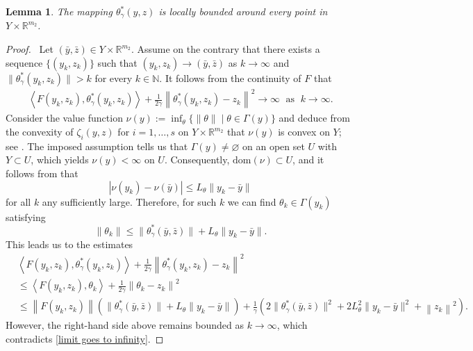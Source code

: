 \documentclass[11pt,a4paper]{article}
\newtheorem{lemma}[theorem]{Lemma}
\theoremstyle{plain}
\begin{document}
\begin{lemma}\label{lemma:local_boundedness}
The mapping \( \theta_\gamma^*(y, z)\) is locally bounded around every point in $Y \times \mathbb{R}^{m_2}$.
\end{lemma}

\begin{proof}\,
Let $(\bar y, \bar z) \in Y \times \mathbb{R}^{m_2}$. Assume on the contrary that there exists a sequence $\{(y_k,z_k)\}$ such that $(y_k, z_k) \to (\bar y, \bar z)$ as $k \to \infty$ and $\|\theta_\gamma^*(y_k,z_k)\| > k$ for every $k \in \mathbb{N}$. It follows from the continuity of $F$ that
\begin{equation}\label{limit goes to infinity}
\begin{aligned}
\left\langle F(y_k,z_k), \theta^*_\gamma(y_k,z_k) \right\rangle
+ \frac{1}{2\gamma} \left\|\theta_\gamma^*(y_k,z_k) - z_k\right\|^2
\to \infty\;\text{ as }\;k \to \infty.
\end{aligned}
\end{equation}
Consider the value function $\nu(y) := \inf_\theta \{ \|\theta\| \mid \theta \in \Gamma(y)\}$ and deduce from the convexity of $\zeta_i(y,z)$ for $i = 1,\ldots,s$ on  \( Y \times \mathbb{R}^{m_2} \) that $\nu(y)$ is convex on $Y$; see \cite[Theorem 2.129]{mordukhovich2022convex}. The imposed assumption tells us that  $\Gamma(y) \neq \varnothing$ on an open set $U$ with $Y \subset U$, which yields $\nu(y) < \infty$ on $U$. Consequently, $\mathrm{dom}(\nu) \subset U$, and it follows from \cite[Corollary 2.152]{mordukhovich2022convex} that
$$
| \nu(y_k) -\nu(\bar{y})| \le L_\theta\|y_k - \bar{y}\|
$$ 
for all $k$ any sufficiently large. Therefore, for such $k$ we can find
$\theta_k \in \Gamma(y_k)$ satisfying 
$$
\|\theta_k\| \le \| \theta^*_\gamma(\bar{y}, \bar{z})\| + L_\theta\|y_k - \bar{y}\|.
$$
This leads us to the estimates
\begin{equation*}
\begin{aligned}
&\left\langle F(y_k,z_k), \theta^*_\gamma(y_k,z_k) \right\rangle
+ \frac{1}{2\gamma} \left\|\theta_\gamma^*(y_k,z_k) - z_k\right\|^2 \\
&\leq\left\langle  F(y_k,z_k), \theta_k \right\rangle
+ \frac{1}{2\gamma} \left\|\theta_k - z_k\right\|^2 \\
&\leq\left\| F(y_k,z_k) \right\| \left(\| \theta^*_\gamma(\bar{y}, \bar{z})\| + L_\theta\|y_k - \bar{y}\| \right) + \frac{1}{\gamma} \left( 2\| \theta^*_\gamma(\bar{y}, \bar{z})\|^2 + 2L_\theta^2\|y_k - \bar{y}\|^2 + \left\|z_k\right\|^2 \right).
\end{aligned}
\end{equation*}
However, the right-hand side above remains bounded as  $k \to \infty$, which contradicts \eqref{limit goes to infinity}. 
\end{proof}\vspace*{0.07in}
\end{document}

